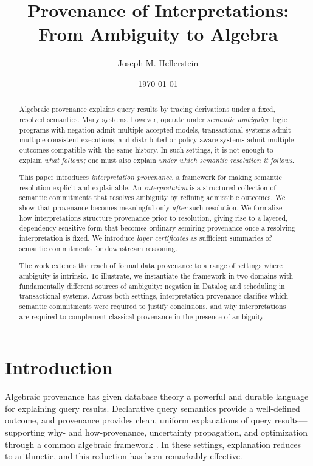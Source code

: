 \documentclass[acmsmall,nonacm]{acmart}
\title{Provenance of Interpretations: From Ambiguity to Algebra}
\author{Joseph M. Hellerstein}
\affiliation{%
  \institution{University of California, Berkeley and Amazon Web Services}
  \country{USA}
}
\date{\today}
\theoremstyle{remark}
\numberwithin{definition}{section}
\numberwithin{theorem}{section}
\numberwithin{lemma}{section}
\numberwithin{corollary}{section}
\numberwithin{remark}{section}
\numberwithin{example}{section}
\numberwithin{observation}{section}
\numberwithin{assumption}{section}
\begin{document}
\begin{abstract}
Algebraic provenance explains query results by tracing derivations under a fixed,
resolved semantics.
Many systems, however, operate under \emph{semantic ambiguity}:
logic programs with negation admit multiple accepted models, transactional
systems admit multiple consistent executions, and distributed or policy-aware
systems admit multiple outcomes compatible with the same history.
In such settings, it is not enough to explain \emph{what follows;} one must also
explain \emph{under which semantic resolution it follows}.

This paper introduces \emph{interpretation provenance}, a framework for making
semantic resolution explicit and explainable.
An \emph{interpretation} is a structured collection of semantic commitments that
resolves ambiguity by refining admissible outcomes.
We show that provenance becomes meaningful only \emph{after} such resolution.
We formalize how interpretations structure provenance prior to resolution, giving
rise to a layered, dependency-sensitive form that becomes ordinary semiring
provenance once a resolving interpretation is fixed.
We introduce \emph{layer certificates} as sufficient summaries of semantic
commitments for downstream reasoning.

The work extends the reach of formal data provenance to a range of 
settings where ambiguity is intrinsic.
To illustrate, we instantiate the framework in two domains with fundamentally different sources
of ambiguity: negation in Datalog and scheduling in transactional systems.
Across both settings, interpretation provenance clarifies which semantic
commitments were required to justify conclusions, and why interpretations
are required to complement classical provenance in the presence of ambiguity.
\end{abstract}

\maketitle

\section{Introduction}
\label{sec:intro}

Algebraic provenance has given database theory a powerful and durable language for
explaining query results.
Declarative query semantics provide a well-defined outcome,
and provenance provides clean, uniform explanations of query
results—supporting why- and how-provenance, uncertainty propagation,
and optimization through a common algebraic framework
\cite{green2007provenance,suciu2011probabilistic}.
In these settings, explanation reduces to arithmetic, and this reduction has been
remarkably effective.
\end{document}
